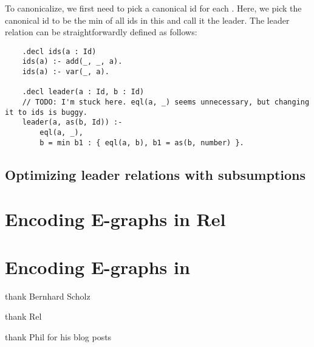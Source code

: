 To canonicalize, we first need to pick a canonical id for each \eclass.
Here, we pick the canonical id to be the min of all ids in this \eclass
 and call it the leader. The leader relation can be straightforwardly defined
 as follows:
\begin{verbatim}
    .decl ids(a : Id)
    ids(a) :- add(_, _, a).
    ids(a) :- var(_, a).

    .decl leader(a : Id, b : Id)
    // TODO: I'm stuck here. eql(a, _) seems unnecessary, but changing it to ids is buggy.
    leader(a, as(b, Id)) :- 
        eql(a, _), 
        b = min b1 : { eql(a, b), b1 = as(b, number) }.
\end{verbatim}

\subsection{Optimizing leader relations with subsumptions}

\section{Encoding E-graphs in Rel}\label{section/rel}

\section{Encoding E-graphs in }

thank Bernhard Scholz

thank Rel

thank Phil for his blog posts
